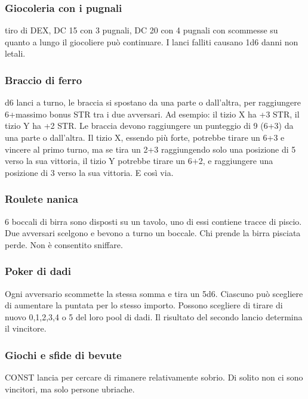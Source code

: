 \documentclass{article}
\begin{document}
              \subsubsection{Giocoleria con i pugnali} tiro di DEX, DC 15 con 3 pugnali, DC 20 con 4 pugnali con scommesse su quanto a lungo il giocoliere può continuare. I lanci falliti causano 1d6 danni non letali.
              \subsubsection{Braccio di ferro} d6 lanci a turno, le braccia si spostano da una parte o dall'altra, per raggiungere 6+massimo bonus STR tra i due avversari. Ad esempio: il tizio X ha +3 STR, il tizio Y ha +2 STR. Le braccia devono raggiungere un punteggio di 9 (6+3) da una parte o dall'altra. Il tizio X, essendo più forte, potrebbe tirare un 6+3 e vincere al primo turno, ma se tira un 2+3 raggiungendo solo una posizione di 5 verso la sua vittoria, il tizio Y potrebbe tirare un 6+2, e raggiungere una posizione di 3 verso la sua vittoria. E così via.
              \subsubsection{Roulete nanica}6 boccali di birra sono disposti su un tavolo, uno di essi contiene tracce di piscio. Due avversari scelgono e bevono a turno un boccale. Chi prende la birra pisciata perde. Non è consentito sniffare.
              \subsubsection{Poker di dadi}Ogni avversario scommette la stessa somma e tira un 5d6. Ciascuno può scegliere di aumentare la puntata per lo stesso importo. Possono scegliere di tirare di nuovo 0,1,2,3,4 o 5 del loro pool di dadi. Il risultato del secondo lancio determina il vincitore.
              \subsubsection{Giochi e sfide di bevute}CONST lancia per cercare di rimanere relativamente sobrio. Di solito non ci sono vincitori, ma solo persone ubriache.
\end{document}
